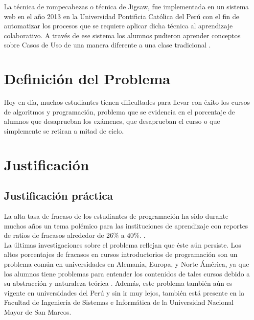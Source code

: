 La técnica de rompecabezas o técnica de Jigsaw, fue implementada en un sistema web en el año 2013 en la Universidad Pontificia Católica del Perú con el fin de automatizar los procesos que se requiere aplicar dicha técnica al aprendizaje colaborativo. A través de ese sistema los alumnos pudieron aprender conceptos sobre Casos de Uso de una manera diferente a una clase tradicional \cite{pinzas_desarrollo_2013}.\\

\section{Definición del Problema}
 Hoy en día, muchos estudiantes tienen dificultades para llevar con éxito los cursos de algoritmos y programación, problema que se evidencia en el porcentaje de alumnos que desaprueban los exámenes, que desaprueban el curso o que simplemente se retiran a mitad de ciclo.

\section{Justificación}
\subsection{Justificación práctica}
La alta tasa de fracaso de los estudiantes de programación ha sido durante muchos años un tema polémico para las instituciones de aprendizaje con reportes de ratios de fracasos alrededor de $26\%$ a $40\%$. \cite{sheard_our_1998,truong_web_2003,lang_seven_2007,han_enhancement_2010}.\\

La últimas investigaciones sobre el problema reflejan que éste aún persiste. Los altos porcentajes de fracasos en cursos introductorios de programación son un problema común en universidades en Alemania, Europa, y Norte Ámérica, ya que los alumnos tiene problemas para entender los contenidos de tales cursos debido a su abstracción y naturaleza teórica \cite{knobelsdorf_teaching_2014}. Además, este problema también aún es vigente en universidades del Perú y sin ir muy lejos, también está presente en la Facultad de Ingeniería de Sistemas e Informática de la Universidad Nacional Mayor de San Marcos.


